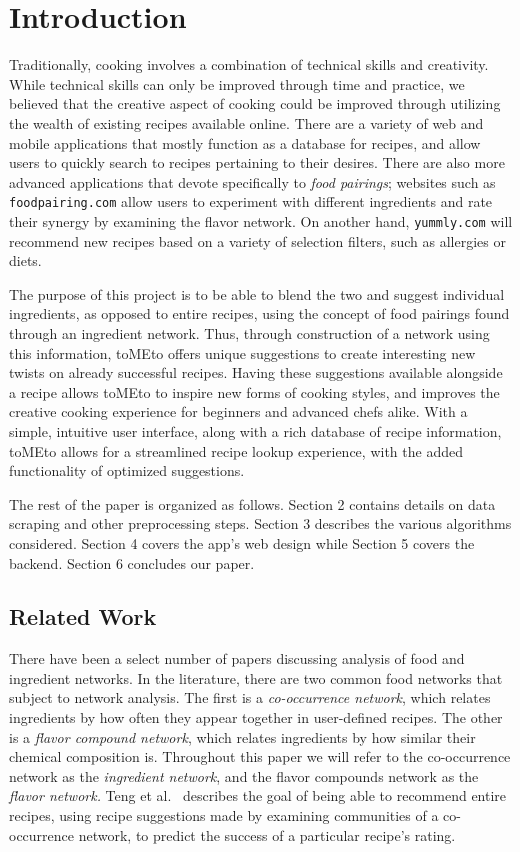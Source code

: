 \documentclass{acm_proc_article-sp}
\begin{document}
\section{Introduction}
Traditionally, cooking involves a combination of technical skills and creativity. While technical skills can only be improved through time and practice, we believed that the creative aspect of cooking could be improved through utilizing the wealth of existing recipes available online. There are a variety of web and mobile applications that mostly function as a database for recipes, and allow users to quickly search to recipes pertaining to their desires. There are also more advanced applications that devote specifically to \textit{food pairings}; websites such as \texttt{foodpairing.com} allow users to experiment with different ingredients and rate their synergy by examining the flavor network. On another hand, \texttt{yummly.com} will recommend new recipes based on a variety of selection filters, such as allergies or diets. 

The purpose of this project is to be able to blend the two and suggest individual ingredients, as opposed to entire recipes, using the concept of food pairings found through an ingredient network. Thus, through construction of a network using this information, toMEto offers unique suggestions to create interesting new twists on already successful recipes. Having these suggestions available alongside a recipe allows toMEto to inspire new forms of cooking styles, and improves the creative cooking experience for beginners and advanced chefs alike. With a simple, intuitive user interface, along with a rich database of recipe information, toMEto allows for a streamlined recipe lookup experience, with the added functionality of optimized suggestions. 

The rest of the paper is organized as follows. Section 2 contains details on data scraping and other preprocessing steps. Section 3 describes the various algorithms considered. Section 4 covers the app's web design while Section 5 covers the backend. Section 6 concludes our paper. 


\subsection{Related Work}

There have been a select number of papers discussing analysis of food and ingredient networks. In the literature, there are two common food networks that subject to network analysis. The first is a \textit{co-occurrence network}, which relates ingredients by how often they appear together in user-defined recipes. The other is a \textit{flavor compound network}, which relates ingredients by how similar their chemical composition is. Throughout this paper we will refer to the co-occurrence network as the \textit{ingredient network}, and the flavor compounds network as the \textit{flavor network.}
Teng et al.~\cite{recommend} describes the goal of being able to recommend entire recipes, using recipe suggestions made by examining communities of a co-occurrence network, to predict the success of a particular recipe's rating. 
\end{document}
